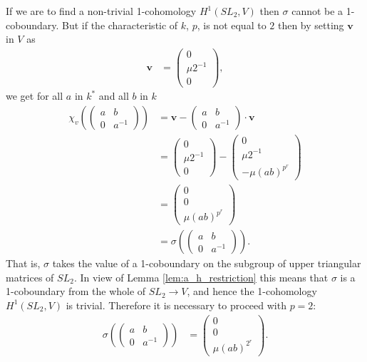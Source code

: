 If we are to find a non-trivial 1-cohomology $H^1(SL_2, V)$ then $\sigma$ cannot be a 1-coboundary. But if the characteristic of $k$, $p$, is not equal to $2$ then by setting $\mathbf{v}$ in $V$ as
\begin{align*}
\mathbf{v} &= \left(\begin{matrix} 0 \\ \mu2^{-1} \\ 0 \end{matrix}\right),
\end{align*}
we get for all $a$ in $k^*$ and all $b$ in $k$
\begin{align*}
\chi_v\left(
\left(\begin{matrix}a & b \\ 0 & a^{-1}\end{matrix}\right)
\right) &=
\mathbf{v}-\left(\begin{matrix}a & b \\ 0 & a^{-1}\end{matrix}\right)\cdot \mathbf{v} \\
&=
\left(\begin{matrix} 0 \\ \mu2^{-1} \\ 0 \end{matrix}\right) - 
\left(\begin{matrix} 0 \\ \mu2^{-1}\ \\ -\mu(ab)^{p^r} \end{matrix}\right)
\\
&=
\left(\begin{matrix} 0 \\ 0 \\ \mu(ab)^{p^r} \end{matrix}\right) \\
&=
\sigma\left(
\left(\begin{matrix} a & b \\ 0 & a^{-1}\end{matrix}\right)
\right).
\end{align*}
	That is, $\sigma$ takes the value of a 1-coboundary on the subgroup of upper triangular matrices of $SL_2$. In view of Lemma \ref{lem:a_h_restriction} this means that $\sigma$ is a 1-coboundary from the whole of $SL_2 \rightarrow V$, and hence the 1-cohomology $H^1(SL_2, V)$ is trivial. Therefore it is necessary to proceed with $p=2$:
	\begin{align}
	\label{b2a:b}
	\sigma\left(
			\left(\begin{matrix} a & b \\ 0 & a^{-1}\end{matrix}\right)
			\right) 
	&=
	\left(\begin{matrix} 0 \\ 0 \\ \mu(ab)^{2^{r}}\end{matrix}\right).
	\end{align}

